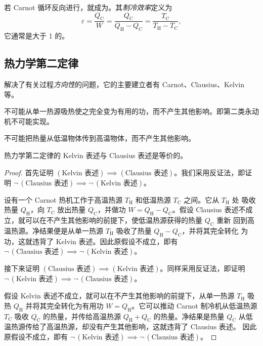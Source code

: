 若 Carnot 循环反向进行，就成为。其\emph{制冷效率}定义为
\begin{equation}
  \varepsilon = \frac{Q_\text{C}}{W}
  = \frac{Q_\text{C}}{Q_\text{H} - Q_\text{C}}
  = \frac{T_\text{C}}{T_\text{H} - T_\text{C}},
\end{equation}
它通常是大于 1 的。

\subsection{热力学第二定律}

解决了有关过程\emph{方向性}的问题，它的主要建立者有 Carnot、Clausius、Kelvin
等。

\begin{theorem}
  不可能从单一热源吸热使之完全变为有用的功，而不产生其他影响。即第二类永动机不可能实现。
\end{theorem}

\begin{theorem}
  不可能把热量从低温物体传到高温物体，而不产生其他影响。
\end{theorem}

热力学第二定律的 Kelvin 表述与 Clausius 表述是等价的。

\begin{proof} %
  \def\Clausius{(\text{Clausius 表述})} \def\Kelvin{(\text{Kelvin 表述})}
  \def\TH{T_\text{H}} \def\TC{T_\text{C}}
  \def\QH{Q_\text{H}} \def\QC{Q_\text{C}}

  首先证明 $\Kelvin\implies\Clausius$。我们采用反证法，即证明
  $\neg\,\Clausius \implies \neg\,\Kelvin$。

  设有一个 Carnot 热机工作于高温热源 $\TH$ 和低温热源 $\TC$ 之间。它从 $\TH$ 处
  吸收热量 $\QH$，向 $\TC$ 放出热量 $\QC$，并做功 $W=\QH-\QC$。假设 Clausius
  表述不成立，就可以在不产生其他影响的前提下，使低温热源获得的热量 $\QC$ 重新
  回到高温热源。净结果便是从单一热源 $\TH$ 吸收了热量 $\QH-\QC$，并将其完全转化
  为功，这就违背了 Kelvin 表述。因此原假设不成立，即有
  $\neg\,\Clausius \implies \neg\,\Kelvin$。

  接下来证明 $\Clausius\implies\Kelvin$。同样采用反证法，即证明
  $\neg\,\Kelvin \implies \neg\,\Clausius$。

  假设 Kelvin 表述不成立，就可以在不产生其他影响的前提下，从单一热源 $\TH$ 吸热
  $\QH$ 并将其完全转化为有用功 $W=\QH$。它可以推动 Carnot 制冷机从低温热源
  $\TC$ 吸收 $\QC$ 的热量，并传给高温热源 $\QH+\QC$ 的热量。净结果是热量 $\QC$
  从低温热源传给了高温热源，却没有产生其他影响，这就违背了 Clausius 表述。
  因此原假设不成立，即有
  $\neg\,\Kelvin \implies \neg\,\Clausius$。
\end{proof}

